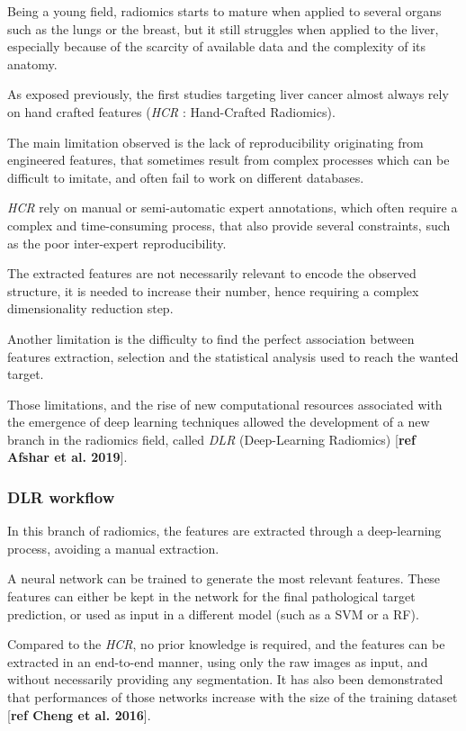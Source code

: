 \documentclass[]{article}
\begin{document}
Being a young field, radiomics starts to mature when applied to several
organs such as the lungs or the breast, but it still struggles when
applied to the liver, especially because of the scarcity of available
data and the complexity of its anatomy.

As exposed previously, the first studies targeting liver cancer almost
always rely on hand crafted features (\emph{HCR} : Hand-Crafted
Radiomics).

The main limitation observed is the lack of reproducibility originating
from engineered features, that sometimes result from complex processes
which can be difficult to imitate, and often fail to work on different
databases.

\emph{HCR} rely on manual or semi-automatic expert annotations, which
often require a complex and time-consuming process, that also provide
several constraints, such as the poor inter-expert reproducibility.

The extracted features are not necessarily relevant to encode the
observed structure, it is needed to increase their number, hence
requiring a complex dimensionality reduction step.

Another limitation is the difficulty to find the perfect association
between features extraction, selection and the statistical analysis used
to reach the wanted target.

Those limitations, and the rise of new computational resources
associated with the emergence of deep learning techniques allowed the
development of a new branch in the radiomics field, called \emph{DLR}
(Deep-Learning Radiomics) {[}\textbf{ref Afshar et al. 2019}{]}.

\subsubsection{DLR workflow}\label{dlr-workflow}

In this branch of radiomics, the features are extracted through a
deep-learning process, avoiding a manual extraction.

A neural network can be trained to generate the most relevant features.
These features can either be kept in the network for the final
pathological target prediction, or used as input in a different model
(such as a SVM or a RF).

Compared to the \emph{HCR}, no prior knowledge is required, and the
features can be extracted in an end-to-end manner, using only the raw
images as input, and without necessarily providing any segmentation. It
has also been demonstrated that performances of those networks increase
with the size of the training dataset {[}\textbf{ref Cheng et al.
2016}{]}.
\end{document}

